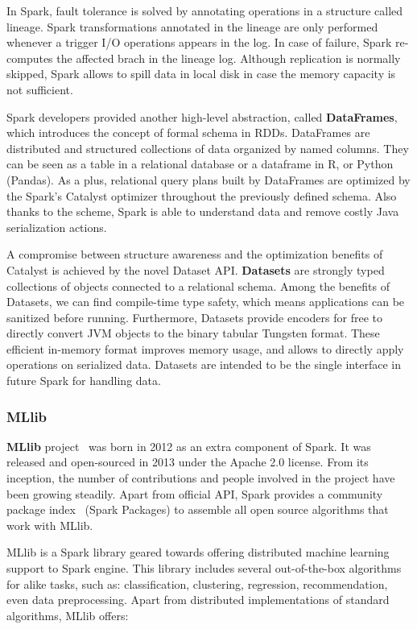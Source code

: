 \documentclass[3p,review]{elsarticle}
\begin{document}
	In Spark, fault tolerance is solved by annotating operations in a structure called lineage. Spark transformations annotated in the lineage are only performed whenever a trigger I/O operations appears in the log. In case of failure, Spark re-computes the affected brach in the lineage log. Although replication is normally skipped, Spark allows to spill data in local disk in case the memory capacity is not sufficient. 
	
	Spark developers provided another high-level abstraction, called \textbf{DataFrames}, which introduces the concept of formal schema in RDDs. DataFrames are distributed and structured collections of data organized by named columns. They can be seen as a table in a relational database or a dataframe in R, or Python (Pandas). As a plus, relational query plans built by DataFrames are optimized by the Spark's Catalyst optimizer throughout the previously defined schema. Also thanks to the scheme, Spark is able to understand data and remove costly Java serialization actions.
	
	A compromise between structure awareness and the optimization benefits of Catalyst is achieved by the novel Dataset API. \textbf{Datasets} are strongly typed collections of objects connected to a relational schema. Among the benefits of Datasets, we can find compile-time type safety, which means applications can be sanitized before running. Furthermore, Datasets provide encoders for free to directly convert JVM objects to the binary tabular Tungsten format. These efficient in-memory format improves memory usage, and allows to directly apply operations on serialized data. Datasets are intended to be the single interface in future Spark for handling data.
	
	\subsubsection{MLlib}
	
	\textbf{MLlib} project~\cite{mllib15} was born in 2012 as an extra component of Spark. It was released and open-sourced in 2013 under the Apache 2.0 license. From its inception, the number of contributions and people involved in the project have been growing steadily. Apart from official API, Spark provides a community package index~\cite{sparkpackages} (Spark Packages) to assemble all open source algorithms that work with MLlib. 
	
	MLlib is a Spark library geared towards offering distributed machine learning support to Spark engine. This library includes several out-of-the-box algorithms for alike tasks, such as: classification, clustering, regression, recommendation, even data preprocessing. Apart from distributed implementations of standard algorithms, MLlib offers:
	
\end{document}
